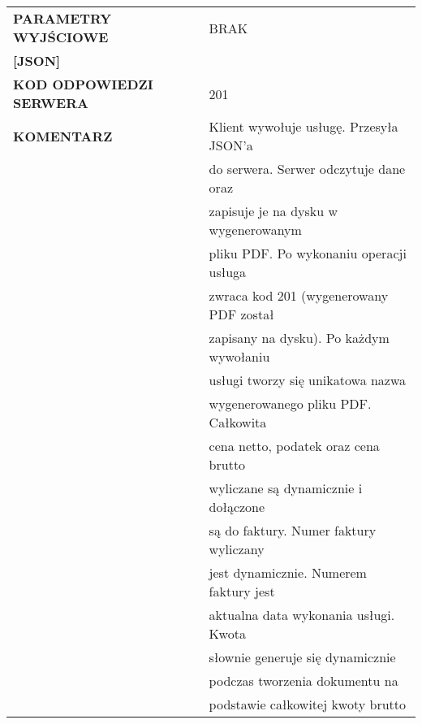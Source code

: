 \documentclass[11pt,a4paper]{article}
\begin{document}
\begin{table}[!h]
\begin{tabular}{|l|l|}
    \textbf{PARAMETRY WYJŚCIOWE} & BRAK \\ \textbf{[JSON]} &                                                                                                                                                                                                                                                                                                                                                                                         \\ \hline
    \textbf{KOD ODPOWIEDZI SERWERA}     & 201                                                                                                                                                                                                                                                                                                                                                                                         \\ \hline
\textbf{KOMENTARZ}                  & Klient wywołuje usługę. Przesyła JSON’a \\ & do serwera. Serwer odczytuje dane oraz \\ & zapisuje je na dysku w wygenerowanym \\ & pliku PDF. Po wykonaniu operacji usługa \\ & zwraca kod 201 (wygenerowany PDF został \\ & zapisany na dysku). Po każdym wywołaniu\\ & usługi tworzy się unikatowa nazwa \\ & wygenerowanego pliku PDF. Całkowita \\ & cena netto, podatek oraz cena brutto \\ & wyliczane są dynamicznie i dołączone \\ & są do faktury. Numer faktury wyliczany \\ & jest dynamicznie. Numerem faktury jest \\ & aktualna data wykonania usługi. Kwota \\ & słownie generuje się dynamicznie \\ & podczas tworzenia dokumentu na \\ & podstawie całkowitej kwoty brutto  \\ \hline
    \end{tabular}
\end{table}
\end{document}
